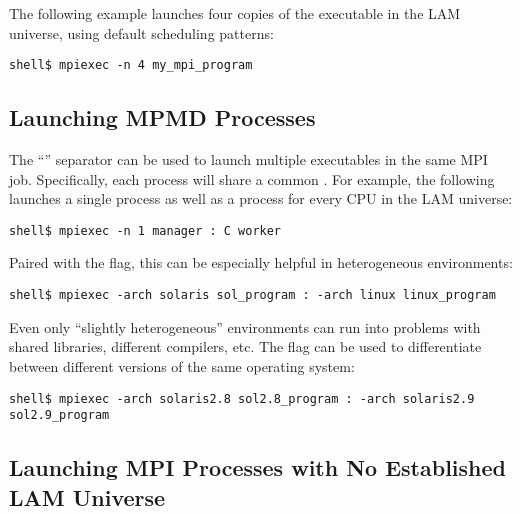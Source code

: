 The following example launches four copies of the
 executable in the LAM universe, using
default scheduling patterns:

\lstset{style=lam-cmdline}
\begin{lstlisting}
shell$ mpiexec -n 4 my_mpi_program
\end{lstlisting}


\subsection{Launching MPMD Processes}

The ``\cmdarg{:}'' separator can be used to launch multiple
executables in the same MPI job.  Specifically, each process will
share a common .  For example, the
following launches a single  process as well as a
 process for every CPU in the LAM universe:

\lstset{style=lam-cmdline}
\begin{lstlisting}
shell$ mpiexec -n 1 manager : C worker
\end{lstlisting}

Paired with the  flag, this can be especially helpful in
heterogeneous environments:

\lstset{style=lam-cmdline}
\begin{lstlisting}
shell$ mpiexec -arch solaris sol_program : -arch linux linux_program
\end{lstlisting}

Even only ``slightly heterogeneous'' environments can run into
problems with shared libraries, different compilers, etc.  The
 flag can be used to differentiate between different
versions of the same operating system:

\lstset{style=lam-cmdline}
\begin{lstlisting}
shell$ mpiexec -arch solaris2.8 sol2.8_program : -arch solaris2.9 sol2.9_program
\end{lstlisting}


\subsection{Launching MPI Processes with No Established LAM Universe}

